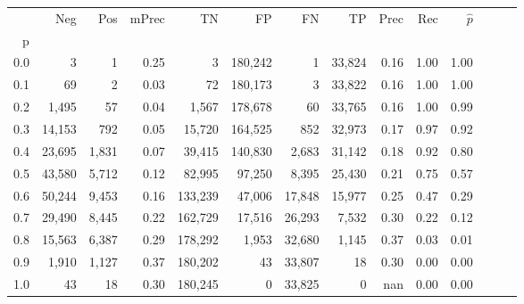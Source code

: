 \begin{tabular}{rrrrrrrrrrrrrr}
\toprule
{} &     Neg &    Pos & mPrec &       TN &       FP &      FN &      TP &  Prec &   Rec & $\hat{p}$ \\
p   &         &        &       &          &          &         &         &       &       &           \\
\midrule
0.0 &       3 &      1 &  0.25 &        3 &  180,242 &       1 &  33,824 &  0.16 &  1.00 &      1.00 \\
0.1 &      69 &      2 &  0.03 &       72 &  180,173 &       3 &  33,822 &  0.16 &  1.00 &      1.00 \\
0.2 &   1,495 &     57 &  0.04 &    1,567 &  178,678 &      60 &  33,765 &  0.16 &  1.00 &      0.99 \\
0.3 &  14,153 &    792 &  0.05 &   15,720 &  164,525 &     852 &  32,973 &  0.17 &  0.97 &      0.92 \\
0.4 &  23,695 &  1,831 &  0.07 &   39,415 &  140,830 &   2,683 &  31,142 &  0.18 &  0.92 &      0.80 \\
0.5 &  43,580 &  5,712 &  0.12 &   82,995 &   97,250 &   8,395 &  25,430 &  0.21 &  0.75 &      0.57 \\
0.6 &  50,244 &  9,453 &  0.16 &  133,239 &   47,006 &  17,848 &  15,977 &  0.25 &  0.47 &      0.29 \\
0.7 &  29,490 &  8,445 &  0.22 &  162,729 &   17,516 &  26,293 &   7,532 &  0.30 &  0.22 &      0.12 \\
0.8 &  15,563 &  6,387 &  0.29 &  178,292 &    1,953 &  32,680 &   1,145 &  0.37 &  0.03 &      0.01 \\
0.9 &   1,910 &  1,127 &  0.37 &  180,202 &       43 &  33,807 &      18 &  0.30 &  0.00 &      0.00 \\
1.0 &      43 &     18 &  0.30 &  180,245 &        0 &  33,825 &       0 &   nan &  0.00 &      0.00 \\
\bottomrule
\end{tabular}
